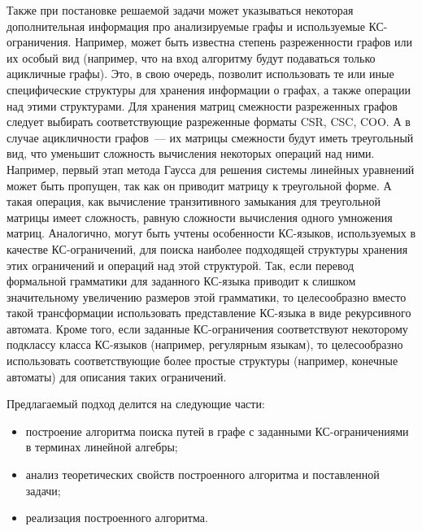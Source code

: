 Также при постановке решаемой задачи может указываться некоторая дополнительная информация про анализируемые графы и используемые КС-ограничения. Например, может быть известна степень разреженности графов или их особый вид (например, что на вход алгоритму будут подаваться только ацикличные графы). Это, в свою очередь, позволит использовать те или иные специфические структуры для хранения информации о графах, а также операции над этими структурами. Для хранения матриц смежности разреженных графов следует выбирать соответствующие разреженные форматы CSR, CSC, COO. А в случае ацикличности графов~--- их матрицы смежности будут иметь треугольный вид, что уменьшит сложность вычисления некоторых операций над ними. Например, первый этап метода Гаусса для решения системы линейных уравнений может быть пропущен, так как он приводит матрицу к треугольной форме. А такая операция, как вычисление транзитивного замыкания для треугольной матрицы имеет сложность, равную сложности вычисления одного умножения матриц. Аналогично, могут быть учтены особенности КС-языков, используемых в качестве КС-ограничений, для поиска наиболее подходящей структуры хранения этих ограничений и операций над этой структурой. Так, если перевод формальной грамматики для заданного КС-языка приводит к слишком значительному увеличению размеров этой грамматики, то целесообразно вместо такой трансформации использовать представление КС-языка в виде рекурсивного автомата. Кроме того, если заданные КС-ограничения соответствуют некоторому подклассу класса КС-языков (например, регулярным языкам), то целесообразно использовать соответствующие более простые структуры (например, конечные автоматы) для описания таких ограничений.

Предлагаемый подход делится на следующие части:
\begin{itemize}
    \item построение алгоритма поиска путей в графе с заданными КС-ограничениями в терминах линейной алгебры;
    \item анализ теоретических свойств построенного алгоритма и поставленной задачи;
    \item реализация построенного алгоритма.
\end{itemize}

